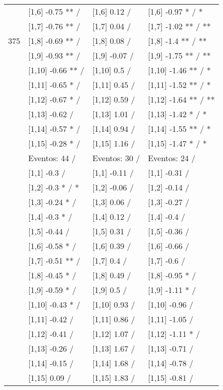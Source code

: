 \begin{table}
\begin{tabular}[t]{llll}
 & {}[1,6] -0.75 ** / & {}[1,6] 0.12  / & {}[1,6] -0.97 * / *\\
 & {}[1,7] -0.76 ** / & {}[1,7] 0.04  / & {}[1,7] -1.02 ** / **\\
375 & {}[1,8] -0.69 ** / & {}[1,8] 0.08  / & {}[1,8] -1.4 ** / **\\
\addlinespace
 & {}[1,9] -0.93 ** / & {}[1,9] -0.07  / & {}[1,9] -1.75 ** / **\\
 & {}[1,10] -0.66 ** / & {}[1,10] 0.5  / & {}[1,10] -1.46 ** / *\\
 & {}[1,11] -0.65 * / & {}[1,11] 0.45  / & {}[1,11] -1.52 ** / *\\
 & {}[1,12] -0.67 * / & {}[1,12] 0.59  / & {}[1,12] -1.64 ** / **\\
 & {}[1,13] -0.62  / & {}[1,13] 1.01  / & {}[1,13] -1.42 * / *\\
\addlinespace
 & {}[1,14] -0.57 * / & {}[1,14] 0.94  / & {}[1,14] -1.55 ** / *\\
 & {}[1,15] -0.28 * / & {}[1,15] 1.16  / & {}[1,15] -1.47 * / *\\
 & Eventos:  44 / & Eventos:  30 / & Eventos:  24 /\\
 & {}[1,1] -0.3  / & {}[1,1] -0.11  / & {}[1,1] -0.31  /\\
 & {}[1,2] -0.3 * / * & {}[1,2] -0.06  / & {}[1,2] -0.14  /\\
\addlinespace
 & {}[1,3] -0.24 * / & {}[1,3] 0.06  / & {}[1,3] -0.27  /\\
 & {}[1,4] -0.3 * / & {}[1,4] 0.12  / & {}[1,4] -0.4  /\\
 & {}[1,5] -0.44  / & {}[1,5] 0.31  / & {}[1,5] -0.36  /\\
 & {}[1,6] -0.58 * / & {}[1,6] 0.39  / & {}[1,6] -0.66  /\\
 & {}[1,7] -0.51 ** / & {}[1,7] 0.4  / & {}[1,7] -0.6  /\\
\addlinespace
500 & {}[1,8] -0.45 * / & {}[1,8] 0.49  / & {}[1,8] -0.95 * /\\
 & {}[1,9] -0.59 * / & {}[1,9] 0.5  / & {}[1,9] -1.11 * /\\
 & {}[1,10] -0.43 * / & {}[1,10] 0.93  / & {}[1,10] -0.96  /\\
 & {}[1,11] -0.42  / & {}[1,11] 0.86  / & {}[1,11] -1.05  /\\
 & {}[1,12] -0.41  / & {}[1,12] 1.07  / & {}[1,12] -1.11 * /\\
\addlinespace
 & {}[1,13] -0.26  / & {}[1,13] 1.67  / & {}[1,13] -0.71  /\\
 & {}[1,14] -0.15  / & {}[1,14] 1.68  / & {}[1,14] -0.78  /\\
 & {}[1,15] 0.09  / & {}[1,15] 1.83  / & {}[1,15] -0.81  /\\
\bottomrule
\end{tabular}
\end{table}
